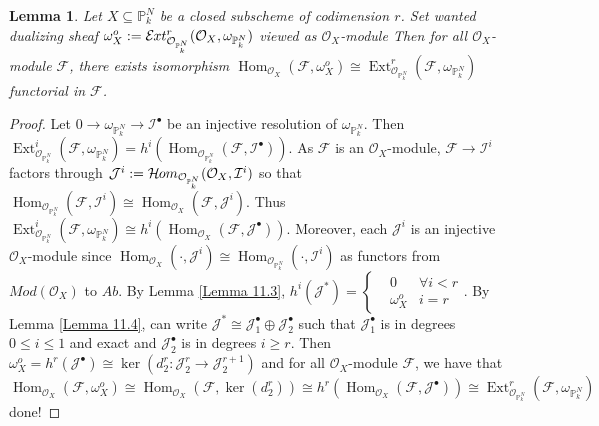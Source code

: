 \documentclass{ctexart}
\newtheorem{lemma}{Lemma}[section]
\renewcommand{\hom}{\operatorname{Hom}}
\newcommand{\ext}{\operatorname{Ext}}
\newcommand{\sheafhom}{\mathcal{H}\kern -.5pt om}
\newcommand{\sheafext}{\mathcal{E}\kern -.5pt xt}
\begin{document}
\begin{lemma}
    Let $X \subseteq \mathbb{P}_{k}^{N}$ be a closed subscheme of codimension $r$.
    Set wanted dualizing sheaf $\omega_{X}^{o} := \sheafext_{\mathcal{O}_{\mathbb{P}_{k}^{N}}}^{r}(\mathcal{O}_{X}, \omega_{\mathbb{P}_{k}^{N}})$ viewed as $\mathcal{O}_{X}$-module
    Then for all $\mathcal{O}_{X}$-module $\mathcal{F}$, there exists isomorphism $\hom_{\mathcal{O}_{X}}(\mathcal{F}, \omega_{X}^{o}) \cong \ext_{\mathcal{O}_{\mathbb{P}_{k}^{N}}}^{r}(\mathcal{F}, \omega_{\mathbb{P}_{k}^{N}})$ functorial in $\mathcal{F}$.
    \label{Lemma 11.5}
\end{lemma}
\begin{proof}
    Let $0 \rightarrow \omega_{\mathbb{P}_{k}^{N}} \rightarrow \mathcal{I}^{\bullet}$ be an injective resolution of $\omega_{\mathbb{P}_{k}^{N}}$.
    Then $\ext_{\mathcal{O}_{\mathbb{P}_{k}^{N}}}^{i}(\mathcal{F}, \omega_{\mathbb{P}_{k}^{N}}) = h^{i}(\hom_{\mathcal{O}_{\mathbb{P}_{k}^{N}}}(\mathcal{F}, \mathcal{I}^{\bullet}))$.
    As $\mathcal{F}$ is an $\mathcal{O}_{X}$-module, $\mathcal{F} \rightarrow \mathcal{I}^{i}$ factors through $\mathcal{J}^{i} := \sheafhom_{\mathcal{O}_{\mathbb{P}_{k}^{N}}}(\mathcal{O}_{X}, \mathcal{I}^{i})$ so that $\hom_{\mathcal{O}_{\mathbb{P}_{k}^{N}}}(\mathcal{F}, \mathcal{I}^{i}) \cong \hom_{\mathcal{O}_{X}}(\mathcal{F}, \mathcal{J}^{i})$.
    Thus $\ext_{\mathcal{O}_{\mathbb{P}_{k}^{N}}}^{i}(\mathcal{F}, \omega_{\mathbb{P}_{k}^{N}}) \cong h^{i}(\hom_{\mathcal{O}_{X}}(\mathcal{F}, \mathcal{J}^{\bullet}))$.
    Moreover, each $\mathcal{J}^{i}$ is an injective $\mathcal{O}_{X}$-module since $\hom_{\mathcal{O}_{X}}(\cdot, \mathcal{J}^{i}) \cong \hom_{\mathcal{O}_{\mathbb{P}_{k}^{N}}}(\cdot, \mathcal{I}^{i})$ as functors from $Mod(\mathcal{O}_{X})$ to $Ab$.
    By Lemma \ref{Lemma 11.3}, $h^{i}(\mathcal{J}^{\ast}) = 
    \left\{
        \begin{aligned}
            & 0 & \forall i < r \\
            & \omega_{X}^{o} & i = r
        \end{aligned}
    \right.
    $.
    By Lemma \ref{Lemma 11.4}, can write $\mathcal{J}^{\ast} \cong \mathcal{J}_{1}^{\bullet} \oplus \mathcal{J}_{2}^{\bullet}$ such that $\mathcal{J}_{1}^{\bullet}$ is in degrees $0 \le i \le 1$ and exact and $\mathcal{J}_{2}^{\bullet}$ is in degrees $i \ge r$.
    Then $\omega_{X}^{o} = h^{r}(\mathcal{J}^{\bullet}) \cong \ker(d_{2}^{r}: \mathcal{J}_{2}^{r} \rightarrow \mathcal{J}_{2}^{r + 1})$ and for all $\mathcal{O}_{X}$-module $\mathcal{F}$,
    we have that 
    \begin{equation*}
        \hom_{\mathcal{O}_{X}}(\mathcal{F}, \omega_{X}^{o}) \cong \hom_{\mathcal{O}_{X}}(\mathcal{F}, \ker(d_{2}^{r})) \cong h^{r}(\hom_{\mathcal{O}_{X}}(\mathcal{F}, \mathcal{J}^{\bullet})) \cong \ext_{\mathcal{O}_{\mathbb{P}_{k}^{N}}}^{r}(\mathcal{F}, \omega_{\mathbb{P}_{k}^{N}})
    \end{equation*}
    done!
\end{proof}
\end{document}
